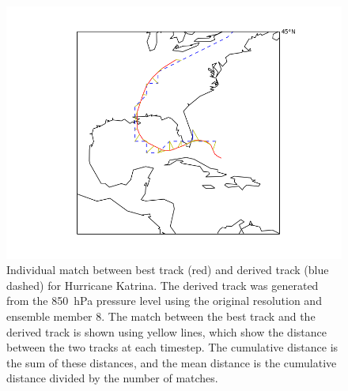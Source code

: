\documentclass[pdftex,12pt,a4paper]{report}
\begin{document}
\begin{figure}[hb!]
    \centering
    \includegraphics[width=\linewidth]{figures/katrina_individual_match_em7}
    \caption{Individual match between best track (red) and derived track (blue dashed) for Hurricane
        Katrina. The derived track was generated from the \SI{850}{hPa} pressure level using the
        original resolution and ensemble member 8. The match between the best track and the derived
        track is shown using yellow lines, which show the distance between the two tracks at each
        timestep. The cumulative distance is the sum of these distances, and the mean distance is
        the cumulative distance divided by the number of matches.
    }
    \label{fig:katrina_individual_match_em7}
\end{figure}
\end{document}
